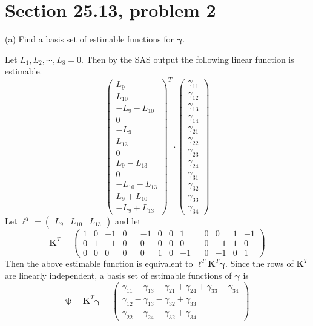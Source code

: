 \section{Section 25.13, problem 2}
(a) Find a basis set of estimable functions for $\bm\gamma$.

\bigskip
\noindent
Let $L_1,L_2,\cdots,L_8=0$. Then by the SAS output the following
linear function is estimable.
\[
\begin{pmatrix}
L_9\\
L_{10}\\
-L_9-L_{10}\\
0\\
-L_9\\
L_{13}\\
0\\
L_9-L_{13}\\
0\\
-L_{10}-L_{13}\\
L_9+L_{10}\\
-L_9+L_{13}
\end{pmatrix}^T
\cdot
\begin{pmatrix}
\gamma_{11}\\
\gamma_{12}\\
\gamma_{13}\\
\gamma_{14}\\
\gamma_{21}\\
\gamma_{22}\\
\gamma_{23}\\
\gamma_{24}\\
\gamma_{31}\\
\gamma_{32}\\
\gamma_{33}\\
\gamma_{34}
\end{pmatrix}
\]
Let $\bm\ell^T=\begin{pmatrix}L_9 & L_{10} & L_{13}\end{pmatrix}$
and let
\[
\mathbf K^T=
\left(\begin{array}{rrrrrrrrrrrrrr}
1 & 0 & -1 & 0 & & -1 & 0 & 0 & 1 & & 0 & 0 & 1 & -1\\
0 & 1 & -1 & 0 & & 0 & 0 & 0 & 0 & & 0 & -1 & 1 & 0\\
0 & 0 & 0 & 0 & & 0 & 1 & 0 & -1 & & 0 & -1 & 0 & 1
\end{array}\right)
\]
Then the above estimable function is equivalent to
$\bm\ell^T\mathbf K^T\bm\gamma$.
Since the rows of $\mathbf K^T$ are linearly independent,
a basis set of estimable functions of $\bm\gamma$ is
\[
\bm\psi=\mathbf K^T\bm\gamma=
\begin{pmatrix}
\gamma_{11}-\gamma_{13}-\gamma_{21}+\gamma_{24}
+\gamma_{33}-\gamma_{34}\\
\gamma_{12}-\gamma_{13}-\gamma_{32}+\gamma_{33}\\
\gamma_{22}-\gamma_{24}-\gamma_{32}+\gamma_{34}
\end{pmatrix}
\]


